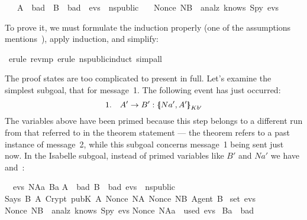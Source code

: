 \begin{isabellebody}
\ \ \ A\ {\isasymnotin}\ bad{\isacharsemicolon}\ \ B\ {\isasymnotin}\ bad{\isacharsemicolon}\ \ evs\ {\isasymin}\ ns{\isacharunderscore}public{\isasymrbrakk}\isanewline
\ \ {\isasymLongrightarrow}\ Nonce\ NB\ {\isasymnotin}\ analz\ {\isacharparenleft}knows\ Spy\ evs{\isacharparenright}{\isachardoublequoteclose}%
\isadelimproof
%
\endisadelimproof
%
\isatagproof
%
\begin{isamarkuptxt}%
To prove it, we must formulate the induction properly (one of the
assumptions mentions~), apply induction, and simplify:%
\end{isamarkuptxt}%
\isamarkuptrue%
\isamarkupfalse%
\ {\isacharparenleft}erule\ rev{\isacharunderscore}mp{\isacharcomma}\ erule\ ns{\isacharunderscore}public{\isachardot}induct{\isacharcomma}\ simp{\isacharunderscore}all{\isacharparenright}%
\begin{isamarkuptxt}%
The proof states are too complicated to present in full.  
Let's examine the simplest subgoal, that for message~1.  The following
event has just occurred:
\[ 1.\quad  A'\to B'  : \mathopen{\{\kern-.30em|} Na',A'\mathclose{|\kern-.32em\}}\sb{Kb'} \]
The variables above have been primed because this step
belongs to a different run from that referred to in the theorem
statement --- the theorem
refers to a past instance of message~2, while this subgoal
concerns message~1 being sent just now.
In the Isabelle subgoal, instead of primed variables like $B'$ and $Na'$
we have  and~:
\begin{isabelle}%
\ {}{\isachardot}\ {\isasymAnd}evs{}\ NAa\ Ba{\isachardot}\isanewline
{}A\ {\isasymnotin}\ bad{\isacharsemicolon}\ B\ {\isasymnotin}\ bad{\isacharsemicolon}\ evs{}\ {\isasymin}\ ns{\isacharunderscore}public{\isacharsemicolon}\isanewline
{}Says\ B\ A\ {\isacharparenleft}Crypt\ {\isacharparenleft}pubK\ A{\isacharparenright}\ {\isasymlbrace}Nonce\ NA{\isacharcomma}\ Nonce\ NB{\isacharcomma}\ Agent\ B{\isasymrbrace}{\isacharparenright}\isanewline
{}\ set\ evs{}\ {\isasymlongrightarrow}\isanewline
{}Nonce\ NB\ {\isasymnotin}\ analz\ {\isacharparenleft}knows\ Spy\ evs{}{\isacharparenright}{\isacharsemicolon}\isanewline
{}Nonce\ NAa\ {\isasymnotin}\ used\ evs{}{\isasymrbrakk}\isanewline
{}\ Ba\ {\isasymin}\ bad\ {\isasymlongrightarrow}\isanewline

\end{isabelle}
\end{isamarkuptxt}
\end{isabellebody}
